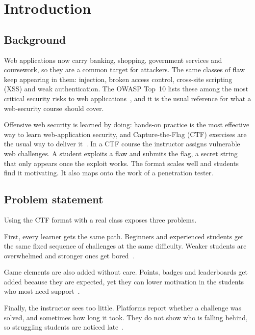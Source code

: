 \chapter{Introduction}
\label{ch:introduction}

\section{Background}

Web applications now carry banking, shopping, government services and coursework, so they are a common target for attackers. The same classes of flaw keep appearing in them: injection, broken access control, cross-site scripting (XSS) and weak authentication. The OWASP Top~10 lists these among the most critical security risks to web applications~\cite{OwaspTop10}, and it is the usual reference for what a web-security course should cover.

Offensive web security is learned by doing: hands-on practice is the most effective way to learn web-application security, and Capture-the-Flag (CTF) exercises are the usual way to deliver it~\cite{Chapman2014picoctf,Svabensky2020what}. In a CTF course the instructor assigns vulnerable web challenges. A student exploits a flaw and submits the flag, a secret string that only appears once the exploit works. The format scales well and students find it motivating. It also maps onto the work of a penetration tester.

\section{Problem statement}

Using the CTF format with a real class exposes three problems.

First, every learner gets the same path. Beginners and experienced students get the same fixed sequence of challenges at the same difficulty. Weaker students are overwhelmed and stronger ones get bored~\cite{Streicher2016adaptive,Vykopal2023smart}.

Game elements are also added without care. Points, badges and leaderboards get added because they are expected, yet they can lower motivation in the students who most need support~\cite{Toda2018dark,Almeida2023negative}.

Finally, the instructor sees too little. Platforms report whether a challenge was solved, and sometimes how long it took. They do not show who is falling behind, so struggling students are noticed late~\cite{Svabensky2024detecting}.

